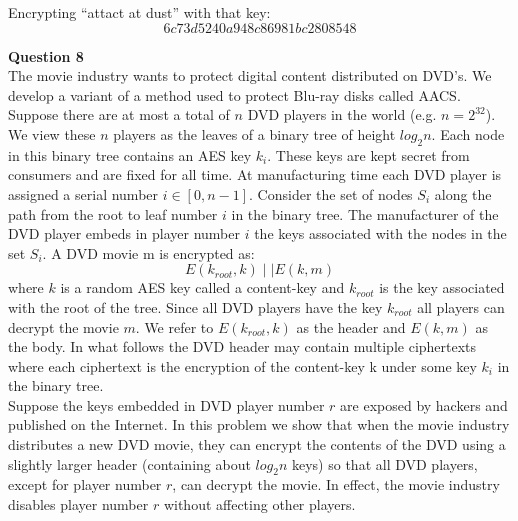 \documentclass[a4paper,12pt]{article}
\begin{document}
Encrypting ``attact at dust'' with that key:
%
\begin{equation*}
6c73d5240a948c86981bc2808548
\end{equation*}

\textbf{Question 8}\\

The movie industry wants to protect digital content distributed on DVD’s. We develop a variant of a method used to protect Blu-ray disks called AACS.\\

Suppose there are at most a total of $n$ DVD players in the world (e.g. $n=2^{32}$). We view these $n$ players as the leaves of a binary tree of height $log_{2}{n}$. Each node in this binary tree contains an AES key $k_{i}$. These keys are kept secret from consumers and are fixed for all time. At manufacturing time each DVD player is assigned a serial number $i\in [0,n - 1]$. Consider the set of nodes $S_{i}$ along the path from the root to leaf number $i$ in the binary tree. The manufacturer of the DVD player embeds in player number $i$ the keys associated with the nodes in the set $S_{i}$. A DVD movie m is encrypted as:
%
\begin{equation*}
E(k_{root},k)\mid \mid E(k,m)
\end{equation*} 
where $k$ is a random AES key called a content-key and $k_{root}$ is the key associated with the root of the tree. Since all DVD players have the key $k_{root}$ all players can decrypt the movie $m$. We refer to $E(k_{root},k)$ as the header and $E(k,m)$ as the body. In what follows the DVD header may contain multiple ciphertexts where each ciphertext is the encryption of the content-key k under some key $k_{i}$ in the binary tree.\\

Suppose the keys embedded in DVD player number $r$ are exposed by hackers and published on the Internet. In this problem we show that when the movie industry distributes a new DVD movie, they can encrypt the contents of the DVD using a slightly larger header (containing about $log_{2}{n}$ keys) so that all DVD players, except for player number $r$, can decrypt the movie. In effect, the movie industry disables player number $r$ without affecting other players.\\
\end{document}
